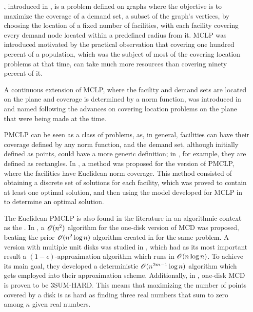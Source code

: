 , introduced in \cite{church:1974}, is 
a problem defined on graphs where the objective is to maximize the coverage of a demand set, a subset of the graph's vertices, by choosing the location of a fixed number of facilities, with each facility covering every demand node located within a predefined radius from it. 
MCLP was introduced motivated by the practical observation that covering one hundred percent of a population, which was the subject of most of the covering location problems at that time, can take much more resources than covering ninety percent of it.

A continuous extension of MCLP, where the facility and demand sets are located on the plane and coverage is determined by a norm function, was introduced in \cite{church:1984} and named  following the advances on covering location problems on the plane that were being made at the time.

PMCLP can be seen as a class of problems, as, in general, facilities can have their coverage defined by any norm function, and the demand set, although initially defined as points, could have a more generic definition; in \cite{bansal}, for example, they are defined as rectangles.
In \cite{church:1984}, a method was proposed for the version of PMCLP, where the facilities have Euclidean norm coverage. This method consisted of obtaining a discrete set of solutions for each facility, which was proved to contain at least one optimal solution, and then using the model developed for MCLP in \cite{church:1974} to determine an optimal solution.

The Euclidean PMCLP is also found in the literature in an algorithmic context as the .
In , a $\mathscr{O}(n^2)$ algorithm for the one-disk version of MCD was proposed, beating the prior $\mathscr{O}(n^2\log{n})$ algorithm created in  for the same problem.
A version with multiple unit disks was studied in , which had as its most important result a $(1-\epsilon)$-approximation algorithm which runs in $\mathscr{O}(n\log{n})$. To achieve its main goal, they developed a deterministic $\mathscr{O}(n^{2m-1}\log{n})$ algorithm which gets employed into their approximation scheme.
Additionally, in , one-disk MCD is proven to be 3SUM-HARD. This means that maximizing the number of points covered by a disk is as hard as finding three real numbers that sum to zero among $n$ given real numbers.

